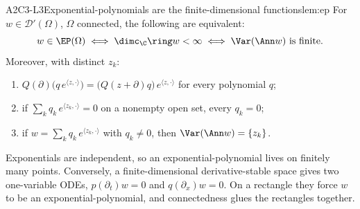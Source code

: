 
\begin{dimcard}{A2}{C3-L3}{Exponential-polynomials are the finite-dimensional functions}{\proved}{lem:ep}
For $w\in\mathcal D'(\Omega)$, $\Omega$ connected, the following are equivalent:
\[
w\in\EP(\Omega)\iff\dimc_\C\ring w<\infty\iff\Var(\Ann w)\ \text{is finite.}
\]
Moreover, with distinct $z_k$:
\begin{enumerate}[label=(\alph*)]
\item $Q(\partial)\big(q\,e^{\langle z,\cdot\rangle}\big)=\big(Q(z+\partial)q\big)\,e^{\langle z,\cdot\rangle}$ for every polynomial $q$;
\item if $\sum_kq_k\,e^{\langle z_k,\cdot\rangle}=0$ on a nonempty open set, every $q_k=0$;
\item if $w=\sum_kq_k\,e^{\langle z_k,\cdot\rangle}$ with $q_k\ne0$, then $\Var(\Ann w)=\{z_k\}$.
\end{enumerate}
\end{dimcard}

\begin{proofidea}
Exponentials are independent, so an exponential-polynomial lives on finitely many points. Conversely, a finite-dimensional derivative-stable space gives two one-variable ODEs, $p(\partial_t)w=0$ and $q(\partial_x)w=0$. On a rectangle they force $w$ to be an exponential-polynomial, and connectedness glues the rectangles together.
\end{proofidea}


